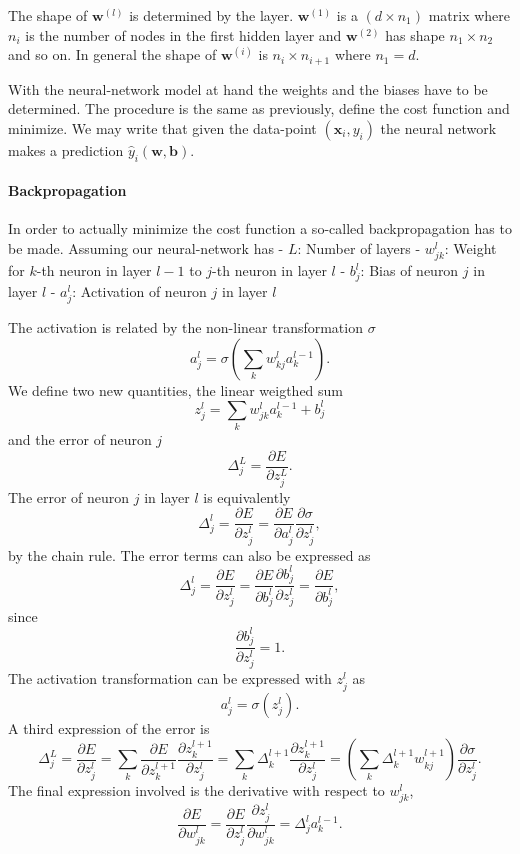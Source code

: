 \documentclass[11pt]{article}
\begin{document}
The shape of \(\boldsymbol{w}^{(l)}\) is determined by the layer.
\(\boldsymbol{w}^{(1)}\) is a \((d\times n_1)\) matrix where \(n_i\) is
the number of nodes in the first hidden layer and
\(\boldsymbol{w}^{(2)}\) has shape \(n_1\times n_2\) and so on. In
general the shape of \(\boldsymbol{w}^{(i)}\) is \(n_i \times n_{i+1}\)
where \(n_1=d\).

With the neural-network model at hand the weights and the biases have to
be determined. The procedure is the same as previously, define the cost
function and minimize. We may write that given the data-point
\((\boldsymbol{x}_i, y_i)\) the neural network makes a prediction
\(\hat{y}_i(\boldsymbol{w},\boldsymbol{b})\).

\hypertarget{backpropagation}{%
\paragraph{Backpropagation}\label{backpropagation}}

In order to actually minimize the cost function a so-called
backpropagation has to be made. Assuming our neural-network has - \(L\):
Number of layers - \(w^l_{jk}\): Weight for \(k\)-th neuron in layer
\(l-1\) to \(j\)-th neuron in layer \(l\) - \(b^l_j\): Bias of neuron
\(j\) in layer \(l\) - \(a^l_j\): Activation of neuron \(j\) in layer
\(l\)

The activation is related by the non-linear transformation \(\sigma\)
\[a^l_j = \sigma\left(\sum_k w^l_{kj}a^{l-1}_k\right).\] We define two
new quantities, the linear weigthed sum
\[z^l_j = \sum_kw^l_{jk}a^{l-1}_k + b^l_j\] and the error of neuron
\(j\) \[\Delta^L_j = \frac{\partial E}{\partial z^L_j}.\] The error of
neuron \(j\) in layer \(l\) is equivalently
\[\Delta^l_j = \frac{\partial E}{\partial z^l_j} = \frac{\partial E}{\partial a^l_j}\frac{\partial \sigma}{\partial z^l_j},\]
by the chain rule. The error terms can also be expressed as
\[\Delta^l_j = \frac{\partial E}{\partial z^l_j} = \frac{\partial E}{\partial b^l_j}\frac{\partial b^l_j}{\partial z^l_j} = \frac{\partial E}{\partial b^l_j},\]
since \[\frac{\partial b^l_j}{\partial z^l_j} = 1.\] The activation
transformation can be expressed with \(z^l_j\) as
\[a^l_j = \sigma\left(z^l_j\right).\] A third expression of the error is
\[\Delta^L_j = \frac{\partial E}{\partial z^l_j} = \sum_k \frac{\partial E}{\partial z^{l+1}_k}\frac{\partial z^{l+1}_k}{\partial z^l_j} = \sum_k \Delta^{l+1}_k\frac{\partial z^{l+1}_k}{\partial z^l_j} = \left(\sum_k\Delta^{l+1}_kw^{l+1}_{kj}\right)\frac{\partial \sigma}{\partial z^l_j}.\]
The final expression involved is the derivative with respect to
\(w^l_{jk}\),
\[\frac{\partial E}{\partial w^l_{jk}} = \frac{\partial E}{\partial z^l_j}\frac{\partial z^l_j}{\partial w^l_{jk}} = \Delta^l_ja^{l-1}_k.\]
\end{document}
